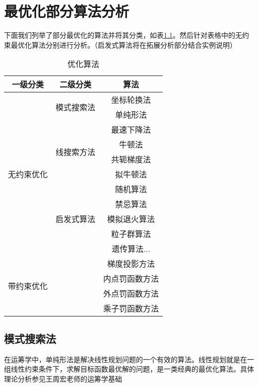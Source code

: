 \chapter{最优化部分算法分析}
下面我们列举了部分最优化的算法并将其分类，如表\ref{algorithm}。然后针对表格中的无约束最优化算法分别进行分析。（启发式算法将在拓展分析部分结合实例说明）
\vspace{-0.5cm}
\begin{table}[htbp]
  \centering
  \caption{优化算法}
    \begin{tabular}{ccc}
    \toprule
    \toprule
    \multicolumn{1}{m{5em}}{一级分类} & \multicolumn{1}{m{4.51em}}{二级分类} & \multicolumn{1}{m{6.89em}}{算法} \\
    \midrule
    \multirow{11}[6]{*}{无约束优化} & \multirow{2}[2]{*}{模式搜索法} & 坐标轮换法 \\
          &       & 单纯形法 \\
\cmidrule{2-3}          & \multirow{4}[2]{*}{线搜索方法} & 最速下降法 \\
          &       & 牛顿法 \\
          &       & 共轭梯度法 \\
          &       & 拟牛顿法 \\
\cmidrule{2-3}          & \multirow{5}[2]{*}{启发式算法} & 随机算法 \\
          &       & 禁忌算法 \\
          &       & 模拟退火算法 \\
          &       & 粒子群算法 \\
          &       & 遗传算法... \\
    \midrule
    \multirow{4}[2]{*}{带约束优化} & \multirow{4}[2]{*}{} & 梯度投影方法 \\
          &       & 内点罚函数方法 \\
          &       & 外点罚函数方法 \\
          &       & 乘子罚函数方法 \\
    \bottomrule
    \bottomrule
    \end{tabular}%
  \label{algorithm}%
\end{table}%
\section{模式搜索法}
在运筹学中，单纯形法是解决线性规划问题的一个有效的算法。线性规划就是在一组线性约束条件下，求解目标函数最优解的问题，是一类经典的最优化算法。具体理论分析参见王周宏老师的运筹学基础\cite{王周宏2011运筹学基础}

